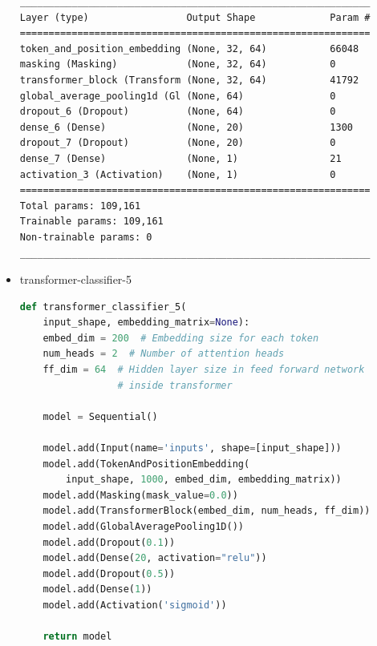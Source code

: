 \documentclass{article}
\begin{document}
\begin{itemize}
\begin{lstlisting}[numbers=none, caption=Обобщение на transformer-classifier-4.]
_____________________________________________________________
Layer (type)                 Output Shape             Param #
=============================================================
token_and_position_embedding (None, 32, 64)           66048
masking (Masking)            (None, 32, 64)           0
transformer_block (Transform (None, 32, 64)           41792
global_average_pooling1d (Gl (None, 64)               0
dropout_6 (Dropout)          (None, 64)               0
dense_6 (Dense)              (None, 20)               1300
dropout_7 (Dropout)          (None, 20)               0
dense_7 (Dense)              (None, 1)                21
activation_3 (Activation)    (None, 1)                0
=============================================================
Total params: 109,161
Trainable params: 109,161
Non-trainable params: 0
_____________________________________________________________
\end{lstlisting}

  \item transformer-classifier-5

\begin{lstlisting}[language=Python, caption=Дефиниция на transformer-classifier-5.]
def transformer_classifier_5(
    input_shape, embedding_matrix=None):
    embed_dim = 200  # Embedding size for each token
    num_heads = 2  # Number of attention heads
    ff_dim = 64  # Hidden layer size in feed forward network
                 # inside transformer

    model = Sequential()

    model.add(Input(name='inputs', shape=[input_shape]))
    model.add(TokenAndPositionEmbedding(
        input_shape, 1000, embed_dim, embedding_matrix))
    model.add(Masking(mask_value=0.0))
    model.add(TransformerBlock(embed_dim, num_heads, ff_dim))
    model.add(GlobalAveragePooling1D())
    model.add(Dropout(0.1))
    model.add(Dense(20, activation="relu"))
    model.add(Dropout(0.5))
    model.add(Dense(1))
    model.add(Activation('sigmoid'))

    return model
\end{lstlisting}


\end{itemize}
\end{document}
